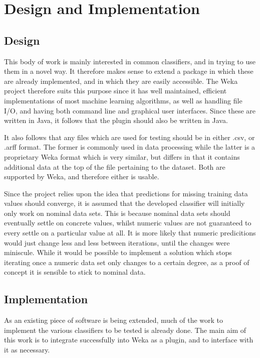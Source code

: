 \newpage
\chapter{Design and Implementation} 
\section{Design}
This body of work is mainly interested in common classifiers, and in trying to use them in a novel way. It therefore makes sense to extend a package in which these are already implemented, and in which they are easily accessible. The Weka project therefore suits this purpose since it has well maintained, efficient implementations of most machine learning algorithms, as well as handling file I/O, and having both command line and graphical user interfaces. Since these are written in Java, it follows that the plugin should also be written in Java.

It also follows that any files which are used for testing should be in either .csv, or .arff format. The former is commonly used in data processing while the latter is a proprietary Weka format which is very similar, but differs in that it contains additional data at the top of the file pertaining to the dataset. Both are supported by Weka, and therefore either is usable.

Since the project relies upon the idea that predictions for missing training data values should converge, it is assumed that the developed classifier will initially only work on nominal data sets. This is because nominal data sets should eventually settle on concrete values, whilst numeric values are not guaranteed to every settle on a particular value at all. It is more likely that numeric predicitions would just change less and less between iterations, until the changes were miniscule. While it would be possible to implement a solution which stops iterating once a numeric data set only changes to a certain degree, as a proof of concept it is sensible to stick to nominal data.

\section{Implementation}
As an existing piece of software is being extended, much of the work to implement the various classifiers to be tested is already done. The main aim of this work is to integrate successfully into Weka as a plugin, and to interface with it as necessary.
